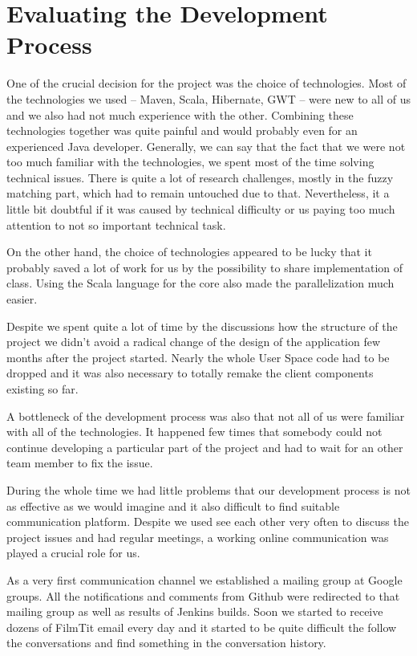 {\section{Evaluating the Development Process}

One of the crucial decision for the project was the choice of technologies. Most of the technologies we used -- Maven, Scala, Hibernate, GWT -- were new to all of us and we also had not much experience with the other. Combining these technologies together was quite painful and would probably even for an experienced Java developer. Generally, we can say that the fact that we were not too much familiar with the technologies, we spent most of the time solving technical issues. There is quite a lot of research challenges, mostly in the fuzzy matching part, which had to remain untouched due to that. Nevertheless, it a little bit doubtful if it was caused by technical difficulty or us paying too much attention to not so important technical task.

On the other hand, the choice of technologies appeared to be lucky that it probably saved a lot of work for us by the possibility to share implementation of class. Using the Scala language for the core also made the parallelization much easier.

Despite we spent quite a lot of time by the discussions how the structure of the project we didn't avoid a radical change of the design of the application few months after the project started. Nearly the whole User Space code had to be dropped and it was also necessary to totally remake the client components existing so far.

A bottleneck of the development process was also that not all of us were familiar with all of the technologies. It happened few times that somebody could not continue developing a particular part of the project and had to wait for an other team member to fix the issue.

During the whole time we had little problems that our development process is not as effective as we would imagine and it also difficult to find suitable communication platform. Despite we used see each other very often to discuss the project issues and had regular meetings, a working online communication was played a crucial role for us.

As a very first communication channel we established a mailing group at Google groups. All the notifications and comments from Github were redirected to that mailing group as well as results of Jenkins builds. Soon we started to receive dozens of FilmTit email every day and it started to be quite difficult the follow the conversations and find something in the conversation history.

}
